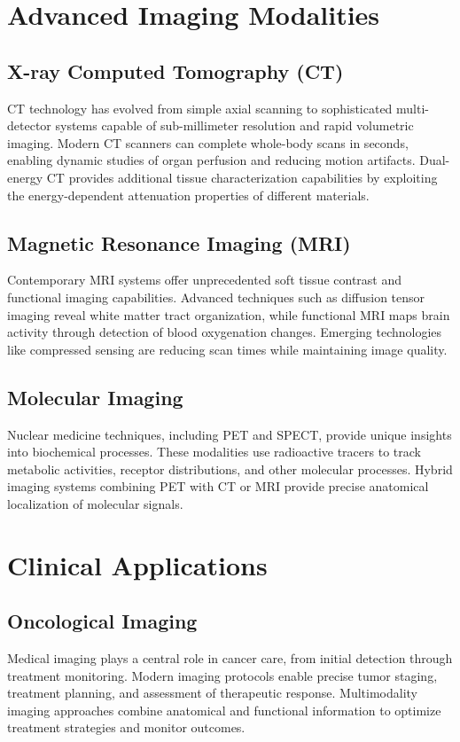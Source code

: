 \documentclass[12pt]{article}
\begin{document}
\section{Advanced Imaging Modalities}

\subsection{X-ray Computed Tomography (CT)}
CT technology has evolved from simple axial scanning to sophisticated multi-detector systems capable of sub-millimeter resolution and rapid volumetric imaging. Modern CT scanners can complete whole-body scans in seconds, enabling dynamic studies of organ perfusion and reducing motion artifacts. Dual-energy CT provides additional tissue characterization capabilities by exploiting the energy-dependent attenuation properties of different materials.

\subsection{Magnetic Resonance Imaging (MRI)}
Contemporary MRI systems offer unprecedented soft tissue contrast and functional imaging capabilities. Advanced techniques such as diffusion tensor imaging reveal white matter tract organization, while functional MRI maps brain activity through detection of blood oxygenation changes. Emerging technologies like compressed sensing are reducing scan times while maintaining image quality.

\subsection{Molecular Imaging}
Nuclear medicine techniques, including PET and SPECT, provide unique insights into biochemical processes. These modalities use radioactive tracers to track metabolic activities, receptor distributions, and other molecular processes. Hybrid imaging systems combining PET with CT or MRI provide precise anatomical localization of molecular signals.

\section{Clinical Applications}

\subsection{Oncological Imaging}
Medical imaging plays a central role in cancer care, from initial detection through treatment monitoring. Modern imaging protocols enable precise tumor staging, treatment planning, and assessment of therapeutic response. Multimodality imaging approaches combine anatomical and functional information to optimize treatment strategies and monitor outcomes.
\end{document}
